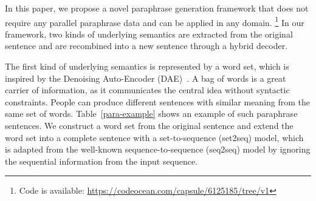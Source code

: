 % 


In this paper, we propose a novel paraphrase generation framework that does not require any parallel paraphrase data and can be applied in any domain. 
\footnote{Code is available: \url{https://codeocean.com/capsule/6125185/tree/v1}}
In our framework, two kinds of underlying semantics are extracted from 
the original sentence and are recombined into a new sentence through 
a hybrid decoder.


The first kind of underlying semantics is represented by a word set, 
which is inspired by the Denoising Auto-Encoder (DAE)~\cite{denoisingAE}. 
A bag of words is a great carrier of information, 
as it communicates the central idea without syntactic constraints. 
People can produce different sentences with similar meaning from the same 
set of words. Table~\ref{para-example} shows an example of such 
paraphrase sentences. We construct a word set from the 
original sentence and extend the word set into a complete sentence 
with a set-to-sequence (set2seq) model, %
which is adapted from the well-known sequence-to-sequence (seq2seq) model 
by ignoring the sequential information from the input sequence.


